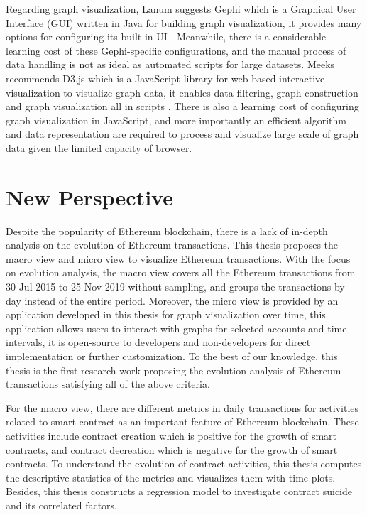 Regarding graph visualization, Lanum suggests Gephi which is a Graphical User Interface (GUI) written in Java for building graph visualization, it provides many options for configuring its built-in UI \cite{4}. Meanwhile, there is a considerable learning cost of these Gephi-specific configurations, and the manual process of data handling is not as ideal as automated scripts for large datasets. Meeks recommends D3.js which is a JavaScript library for web-based interactive visualization to visualize graph data, it enables data filtering, graph construction and graph visualization all in scripts \cite{5}. There is also a learning cost of configuring graph visualization in JavaScript, and more importantly an efficient algorithm and data representation are required to process and visualize large scale of graph data given the limited capacity of browser.

\section{New Perspective}
\label{sec:review:perspective}

Despite the popularity of Ethereum blockchain, there is a lack of in-depth analysis on the evolution of Ethereum transactions. This thesis proposes the macro view and micro view to visualize Ethereum transactions. With the focus on evolution analysis, the macro view covers all the Ethereum transactions from 30 Jul 2015 to 25 Nov 2019 without sampling, and groups the transactions by day instead of the entire period. Moreover, the micro view is provided by an application developed in this thesis for graph visualization over time, this application allows users to interact with graphs for selected accounts and time intervals, it is open-source to developers and non-developers for direct implementation or further customization. To the best of our knowledge, this thesis is the first research work proposing the evolution analysis of Ethereum transactions satisfying all of the above criteria.

For the macro view, there are different metrics in daily transactions for activities related to smart contract as an important feature of Ethereum blockchain. These activities include contract creation which is positive for the growth of smart contracts, and contract decreation which is negative for the growth of smart contracts. To understand the evolution of contract activities, this thesis computes the descriptive statistics of the metrics and visualizes them with time plots. Besides, this thesis constructs a regression model to investigate contract suicide and its correlated factors.

